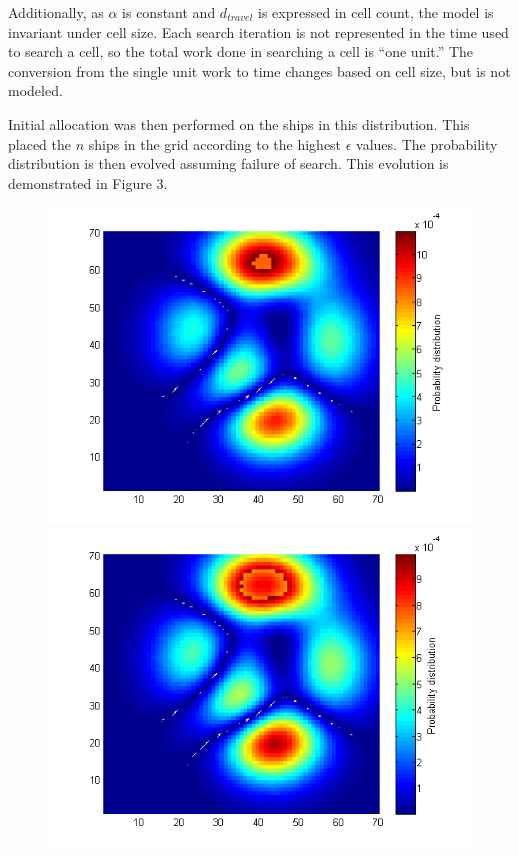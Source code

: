 \documentclass[a4paper]{article}
\begin{document}
Additionally, as $\alpha$ is constant and $d_{travel}$ is expressed in cell count, the model is invariant under cell size. Each search iteration is not represented in the time used to search a cell, so the total work done in searching a cell is ``one unit.'' The conversion from the single unit work to time changes based on cell size, but is not modeled.

Initial allocation was then performed on the ships in this distribution. This placed the $n$ ships in the grid according to the highest $\epsilon$ values. The probability distribution is then evolved assuming failure of search. This evolution is demonstrated in Figure 3. 

\begin{figure}[H]\begin{center}
\includegraphics[scale=0.35]{../Matlab/Images/ModelSearch001.png}
\includegraphics[scale=0.35]{../Matlab/Images/ModelSearch020.png}

\end{center}
\end{figure}
\end{document}
